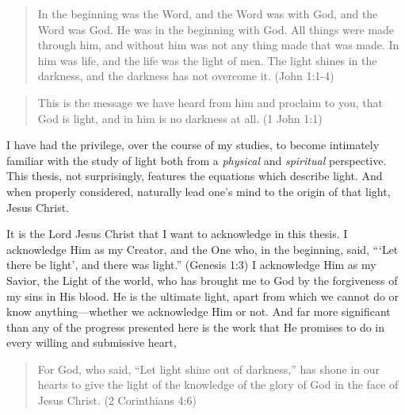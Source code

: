 \begin{quote}
In the beginning was the Word, and the Word was with God, and the Word was God. He was in the beginning with God. All things were made through him, and without him was not any thing made that was made. In him was life, and the life was the light of men. The light shines in the darkness, and the darkness has not overcome it. (John 1:1-4)
\end{quote}

\begin{quote}This is the message we have heard from him and proclaim to you, that God is light, and in him is no darkness at all. (1 John 1:1) \end{quote}

I have had the privilege, 
    over the course of my studies,
    to become intimately familiar with the study of light 
    both from a \emph{physical} and \emph{spiritual} perspective.
This thesis, not surprisingly, 
    features the equations which describe light.
And when properly considered,
    naturally lead one's mind to the origin of that light, Jesus Christ.

It is the Lord Jesus Christ that I want to acknowledge in this thesis.
I acknowledge Him as my Creator,
    and the One who, in the beginning, said, 
    ```Let there be light', and there was light.'' (Genesis 1:3)
I acknowledge Him as my Savior, the Light of the world,
    who has brought me to God by the forgiveness of my sins in His blood.
He is the ultimate light, 
    apart from which we cannot do or know anything---whether
    we acknowledge Him or not.
And far more significant than any of the progress presented here
    is the work that He promises to do in every willing and submissive heart,
\begin{quote}
For God, who said, ``Let light shine out of darkness,'' has shone in our hearts to give the light of the knowledge of the glory of God in the face of Jesus Christ.
(2 Corinthians 4:6)
\end{quote}

\afterpreface
